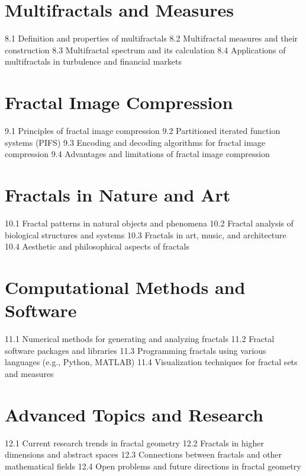 \section{Multifractals and Measures}
8.1 Definition and properties of multifractals
8.2 Multifractal measures and their construction
8.3 Multifractal spectrum and its calculation
8.4 Applications of multifractals in turbulence and financial markets
\section{Fractal Image Compression}
9.1 Principles of fractal image compression
9.2 Partitioned iterated function systems (PIFS)
9.3 Encoding and decoding algorithms for fractal image compression
9.4 Advantages and limitations of fractal image compression
\section{Fractals in Nature and Art}
10.1 Fractal patterns in natural objects and phenomena
10.2 Fractal analysis of biological structures and systems
10.3 Fractals in art, music, and architecture
10.4 Aesthetic and philosophical aspects of fractals
\section{Computational Methods and Software}
11.1 Numerical methods for generating and analyzing fractals
11.2 Fractal software packages and libraries
11.3 Programming fractals using various languages (e.g., Python, MATLAB)
11.4 Visualization techniques for fractal sets and measures
\section{Advanced Topics and Research}
12.1 Current research trends in fractal geometry
12.2 Fractals in higher dimensions and abstract spaces
12.3 Connections between fractals and other mathematical fields
12.4 Open problems and future directions in fractal geometry
